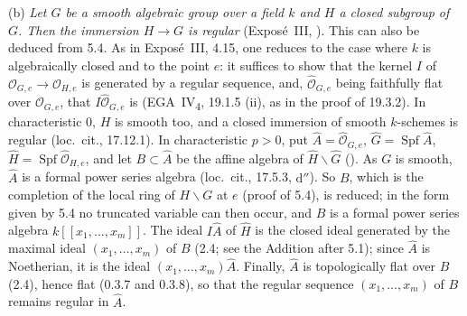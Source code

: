 \smallskip
\noindent(b) \emph{Let \(G\) be a smooth algebraic group over a field
\(k\) and \(H\) a closed subgroup of \(G\). Then the immersion \(H\to G\)
is regular} (Expos\'e~III, ). This can also be deduced from
5.4. As in Expos\'e~III, 4.15, one reduces to the case where \(k\) is
algebraically closed and to the point \(e\): it suffices to show that the
kernel \(I\) of \(\mathcal O_{G,e}\to\mathcal O_{H,e}\) is generated by a
regular sequence, and, \(\widehat{\mathcal O}_{G,e}\) being faithfully
flat over \(\mathcal O_{G,e}\), that \(I\widehat{\mathcal O}_{G,e}\) is
(EGA~IV\textsubscript{4}, 19.1.5 (ii), as in the proof of 19.3.2). In
characteristic \(0\), \(H\) is smooth too, and a closed immersion of
smooth \(k\)-schemes is regular (loc.\ cit., 17.12.1). In characteristic
\(p>0\), put \(\widehat A=\widehat{\mathcal O}_{G,e}\),
\(\widehat G=\operatorname{Spf}\widehat A\),
\(\widehat H=\operatorname{Spf}\widehat{\mathcal O}_{H,e}\), and let
\(B\subset\widehat A\) be the affine algebra of
\(\widehat H\backslash\widehat G\) \textup{()}. As \(G\) is smooth,
\(\widehat A\) is a formal power series algebra (loc.\ cit., 17.5.3,
\(\mathrm d''\)). So \(B\), which is the completion of the local ring of
\(H\backslash G\) at \(e\) (proof of 5.4), is reduced; in the form given by
5.4 no truncated variable can then occur, and \(B\) is a formal power
series algebra \(k[[x_1,\ldots,x_m]]\). The ideal \(I\widehat A\) of
\(\widehat H\) is the closed ideal generated by the maximal ideal
\((x_1,\ldots,x_m)\) of \(B\) (2.4; see the Addition after 5.1); since
\(\widehat A\) is Noetherian, it is the ideal \((x_1,\ldots,x_m)\widehat A\).
Finally, \(\widehat A\) is topologically flat over \(B\) (2.4), hence flat
(0.3.7 and 0.3.8), so that the regular sequence \((x_1,\ldots,x_m)\) of
\(B\) remains regular in \(\widehat A\).

